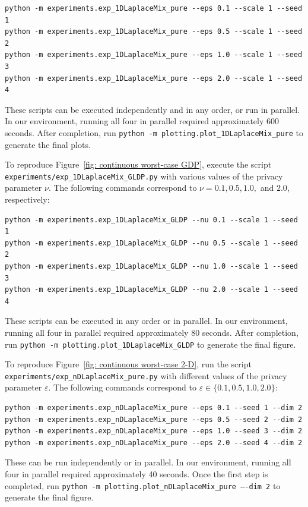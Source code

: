 \documentclass[accepted]{article}
\theoremstyle{plain} %
\theoremstyle{definition}
\theoremstyle{remark}
\newcommand{\eps}{\varepsilon}
\begin{document}
\begin{verbatim}
python -m experiments.exp_1DLaplaceMix_pure --eps 0.1 --scale 1 --seed 1 
python -m experiments.exp_1DLaplaceMix_pure --eps 0.5 --scale 1 --seed 2 
python -m experiments.exp_1DLaplaceMix_pure --eps 1.0 --scale 1 --seed 3 
python -m experiments.exp_1DLaplaceMix_pure --eps 2.0 --scale 1 --seed 4 
\end{verbatim}

These scripts can be executed independently and in any order, or run in parallel. In our environment, running all four in parallel required approximately 600 seconds. After completion, run \texttt{python -m plotting.plot\_1DLaplaceMix\_pure} to generate the final plots.

To reproduce Figure~\ref{fig: continuous worst-case GDP}, execute the script \texttt{experiments/exp\_1DLaplaceMix\_GLDP.py} with various values of the privacy parameter \( \nu \). The following commands correspond to \( \nu = 0.1, 0.5, 1.0, \) and \( 2.0 \), respectively:

\begin{verbatim}
python -m experiments.exp_1DLaplaceMix_GLDP --nu 0.1 --scale 1 --seed 1 
python -m experiments.exp_1DLaplaceMix_GLDP --nu 0.5 --scale 1 --seed 2
python -m experiments.exp_1DLaplaceMix_GLDP --nu 1.0 --scale 1 --seed 3 
python -m experiments.exp_1DLaplaceMix_GLDP --nu 2.0 --scale 1 --seed 4 
\end{verbatim}

These scripts can be executed in any order or in parallel. In our environment, running all four in parallel required approximately 80 seconds. After completion, run \texttt{python -m plotting.plot\_1DLaplaceMix\_GLDP} to generate the final figure.

To reproduce Figure~\ref{fig: continuous worst-case 2-D}, run the script \texttt{experiments/exp\_nDLaplaceMix\_pure.py} with different values of the privacy parameter \( \eps \). The following commands correspond to \( \eps \in \{0.1, 0.5, 1.0, 2.0\} \):

\begin{verbatim}
python -m experiments.exp_nDLaplaceMix_pure --eps 0.1 --seed 1 --dim 2
python -m experiments.exp_nDLaplaceMix_pure --eps 0.5 --seed 2 --dim 2
python -m experiments.exp_nDLaplaceMix_pure --eps 1.0 --seed 3 --dim 2
python -m experiments.exp_nDLaplaceMix_pure --eps 2.0 --seed 4 --dim 2
\end{verbatim}

These can be run independently or in parallel. In our environment, running all four in parallel required approximately 40 seconds. Once the first step is completed, run \texttt{python -m plotting.plot\_nDLaplaceMix\_pure ----dim 2} to generate the final figure.
\end{document}
